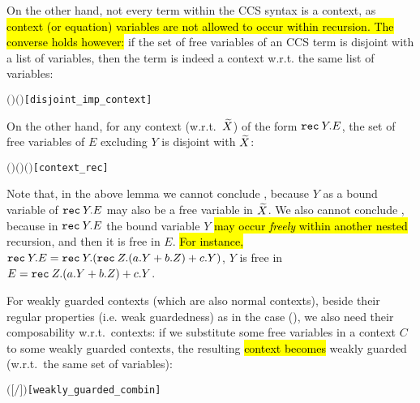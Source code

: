 On the other hand, not every term within the CCS syntax is a context, as 
\hl{context (or equation) variables are not allowed to occur within recursion. The converse
holds however:} if the set of free variables of an CCS term
is disjoint with a list of variables, then the term is indeed a context
w.r.t. the same list of variables:
\begin{alltt}
\HOLTokenTurnstile{}  \ensuremath{(} \ensuremath{)} \ensuremath{(} \ensuremath{)} \HOLSymConst{\HOLTokenImp{}}   \hfill{[disjoint_imp_context]}
\end{alltt}
On the other hand, for any context (w.r.t.~$\widetilde X$) of the form ${\tt rec}\: Y . E$,
the set of free variables of $E$ excluding $Y$ is disjoint with $\widetilde X$:
\begin{alltt}
\HOLTokenTurnstile{}   \ensuremath{(}  \ensuremath{)} \HOLSymConst{\HOLTokenImp{}}  \ensuremath{(}   \ensuremath{)} \ensuremath{(} \ensuremath{)}\hfill{[context_rec]}
\end{alltt}
Note that, in the above lemma we cannot
conclude , because $Y$ as a bound
variable of ${\tt rec}\: Y . E$ may also be a free variable in $\widetilde X$. We
also cannot conclude , because in ${\tt rec}\: Y . E$
the bound variable $Y$ \hl{may occur \emph{freely} within another nested}
recursion, and then it is free in $E$. \hl{For instance,} ${\tt rec}\: Y . E = {\tt rec}\: Y . ({\tt rec}\: Z . (a.Y + b.Z) + c.Y)$, $Y$ is free in $E = {\tt rec}\: Z . (a.Y + b.Z) + c.Y$.

For weakly guarded contexts (which are also normal contexts), beside
their regular properties (i.e. weak
guardedness) as in the \univariate case (), we also need
their composability w.r.t.~\multivariate contexts: if we
substitute some free variables in a context $C$ to some weakly guarded
contexts, the resulting \hl{context becomes} weakly guarded (w.r.t.~the same set of variables):
\begin{alltt}
\HOLTokenTurnstile{}   \HOLSymConst{\HOLTokenConj{}}    \HOLSymConst{\HOLTokenConj{}}    \HOLSymConst{\HOLTokenConj{}}
     \HOLSymConst{\ensuremath{=}}   \HOLSymConst{\HOLTokenImp{}}
     \ensuremath{(}\ensuremath{[}\ensuremath{/}\ensuremath{]} \ensuremath{)}\hfill{[weakly_guarded_combin]}
\end{alltt}

